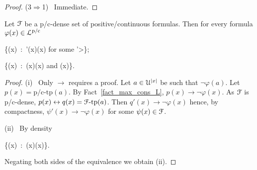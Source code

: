 \documentclass{amsproc}
\renewcommand*{\emph}[1]{%
   \smash{\tikz[baseline]\node[rectangle, fill=teal!25, rounded corners, inner xsep=0.5ex, inner ysep=0.2ex, anchor=base, minimum height = 2.7ex]{\strut #1};}}
\begin{document}
{\begin{proof}
  (3$\Rightarrow$1) \ 
  Immediate.
\end{proof}

\begin{proposition}\label{prop_Fapprox}
  Let ${\EuScript F}$ be a p/c-dense set of positive/continuous formulas.
  Then for every formula $\varphi(x)\in{\EuScript L}^{\rm p/c}$
  
  {\leftrightarrow}
  {\bigvee\big\{\psi(x)\ :\  \psi'(x)\rightarrow\neg\varphi(x)\textrm{ for some }\psi'>\psi\big\};}

  {\leftrightarrow}
  {\bigvee\big\{\neg\psi(x)\ :\ \neg\psi(x)\rightarrow\neg\varphi(x)\textrm{ and }\psi(x)\big\}.}

\end{proposition}
 
\begin{proof} 
  (i) \ Only $\rightarrow$ requires a proof.
  Let $a\in {\EuScript U}^{|x|}$ be such that $\neg\varphi(a)$.
  Let $p(x)=\mbox{p/c-tp}(a)$.
  By Fact~\ref{fact_max_cons_L}, $p(x)\rightarrow\neg\varphi(x)$.
  As ${\EuScript F}$ is p/c-dense, $p(x)\leftrightarrow q(x)={\EuScript F}\mbox{-tp}(a)$.
  Then $q'(x)\rightarrow\neg\varphi(x)$ hence, by compactness, $\psi'(x)\rightarrow\neg\varphi(x)$ for some $\psi(x)\in{\EuScript F}$.

  (ii) \ By density

  {\leftrightarrow}
  {\bigwedge\big\{\psi(x)\ :\ \varphi(x)\rightarrow\psi(x)\big\}.}
  
  Negating both sides of the equivalence we obtain (ii).
\end{proof}


\begin{comment}
\section{Elimination of quantifiers of sort \textsf{I} for positive formulas}\label{Ielimination}

We write \emph{${\EuScript L}^{\rm p/c}_{{\sf I}{\rm qf}}$} for the set of positive/continuous formulas without quantifiers of sort ${\sf I}$.

In this section we show that ${\EuScript L}^{\rm p}_{{\sf I}{\rm qf}}$ is p-dense modulo $T$ (the theory of ${\EuScript U}$).
In plain words, this amounts to the elimination of the quantifiers of sort ${\sf I}$ up to some approximation.
In Section~\ref{cIelimination} we prove the analogous result for ${\EuScript L}^{\rm c}_{{\sf I}{\rm qf}}$.


\end{comment}}
\end{document}
